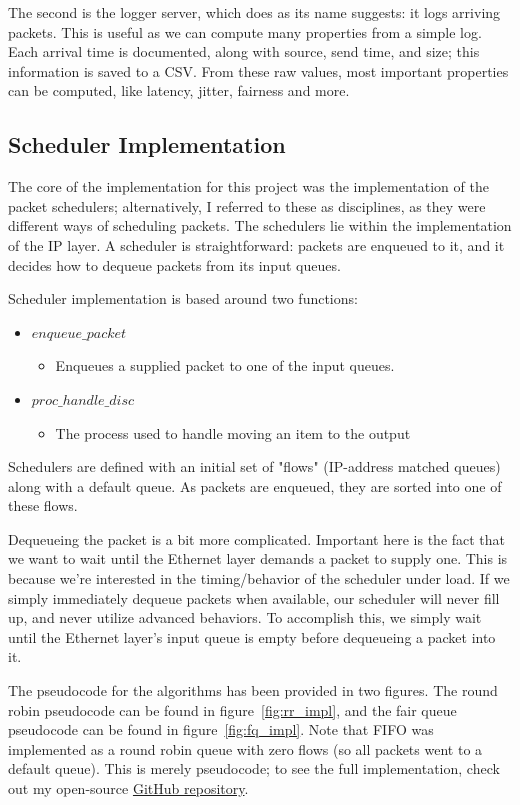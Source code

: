 \documentclass[conference]{IEEEtran}
\begin{document}
The second is the logger server, which does as its name suggests: it logs arriving packets.
This is useful as we can compute many properties from a simple log.
Each arrival time is documented, along with source, send time, and size; this information is saved to a CSV.
From these raw values, most important properties can be computed, like latency, jitter, fairness and more.

    \subsection{Scheduler Implementation}
The core of the implementation for this project was the implementation of the packet schedulers; alternatively, I referred
to these as disciplines, as they were different ways of scheduling packets.
The schedulers lie within the implementation of the IP layer.
A scheduler is straightforward: packets are enqueued to it, and it decides how to dequeue packets from its input queues.

Scheduler implementation is based around two functions:
\begin{itemize}
    \item $enqueue\_packet$
    \begin{itemize}
        \item Enqueues a supplied packet to one of the input queues.
    \end{itemize}
    \item $proc\_handle\_disc$
    \begin{itemize}
        \item The process used to handle moving an item to the output
    \end{itemize}
\end{itemize}

Schedulers are defined with an initial set of "flows" (IP-address matched queues) along with a default queue.
As packets are enqueued, they are sorted into one of these flows.

Dequeueing the packet is a bit more complicated.
Important here is the fact that we want to wait until the Ethernet layer demands a packet to supply one.
This is because we're interested in the timing/behavior of the scheduler under load.
If we simply immediately dequeue packets when available, our scheduler will never fill up, and never utilize advanced
behaviors.
To accomplish this, we simply wait until the Ethernet layer's input queue is empty before dequeueing a packet into it.

The pseudocode for the algorithms has been provided in two figures.
The round robin pseudocode can be found in figure~\ref{fig:rr_impl}, and the fair queue pseudocode can be found in
figure~\ref{fig:fq_impl}.
Note that FIFO was implemented as a round robin queue with zero flows (so all packets went to a default queue).
This is merely pseudocode; to see the full implementation, check out my open-source \href{https://github.com/Ruchotzke/558-final}{GitHub repository}.
\end{document}
